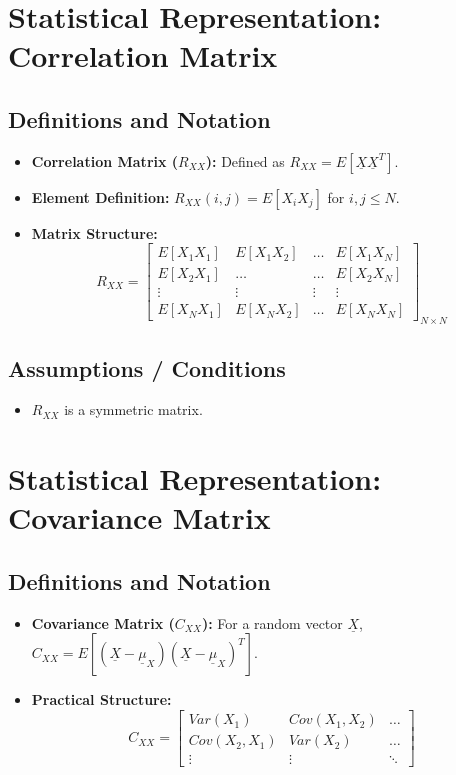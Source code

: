 \documentclass[12pt]{article}
\begin{document}
\section{Statistical Representation: Correlation Matrix}
\subsection{Definitions and Notation}
\begin{itemize}
    \item \textbf{Correlation Matrix ($R_{XX}$):} Defined as $R_{XX} = E[\underline{X}\underline{X}^{T}]$.
    \item \textbf{Element Definition:} $R_{XX}(i,j) = E[X_{i}X_{j}]$ for $i, j \le N$.
    \item \textbf{Matrix Structure:}
    \[
    R_{XX} = \begin{bmatrix} 
    E[X_{1}X_{1}] & E[X_{1}X_{2}] & \dots & E[X_{1}X_{N}] \\ 
    E[X_{2}X_{1}] & \dots & \dots & E[X_{2}X_{N}] \\ 
    \vdots & \vdots & \vdots & \vdots \\ 
    E[X_{N}X_{1}] & E[X_{N}X_{2}] & \dots & E[X_{N}X_{N}] 
    \end{bmatrix}_{N \times N}
    \]
\end{itemize}

\subsection{Assumptions / Conditions}
\begin{itemize}
    \item $R_{XX}$ is a symmetric matrix.
\end{itemize}

\section{Statistical Representation: Covariance Matrix}
\subsection{Definitions and Notation}
\begin{itemize}
    \item \textbf{Covariance Matrix ($C_{XX}$):} For a random vector $\underline{X}$, $C_{XX} = E[(\underline{X}-\underline{\mu}_{X})(\underline{X}-\underline{\mu}_{X})^{T}]$.
    \item \textbf{Practical Structure:}
    \[
    C_{XX} = \begin{bmatrix} 
    Var(X_{1}) & Cov(X_{1},X_{2}) & \dots \\ 
    Cov(X_{2},X_{1}) & Var(X_{2}) & \dots \\ 
    \vdots & \vdots & \ddots 
    \end{bmatrix}
    \]
\end{itemize}
\end{document}
